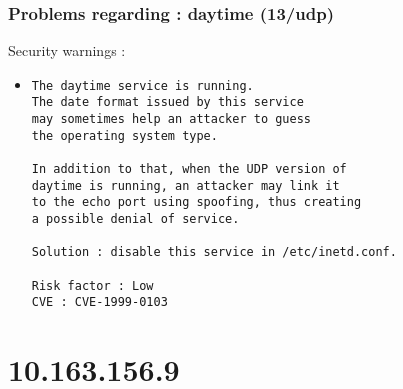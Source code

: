 \documentclass{article}
\begin{document}
\subsubsection{Problems regarding : daytime (13/udp)}
Security warnings :\\
\begin{itemize}
\item \begin{verbatim}
The daytime service is running.
The date format issued by this service
may sometimes help an attacker to guess
the operating system type. 

In addition to that, when the UDP version of
daytime is running, an attacker may link it 
to the echo port using spoofing, thus creating
a possible denial of service.

Solution : disable this service in /etc/inetd.conf.

Risk factor : Low
CVE : CVE-1999-0103
\end{verbatim}\end{itemize}
\newpage
\section{10.163.156.9}
\end{document}
